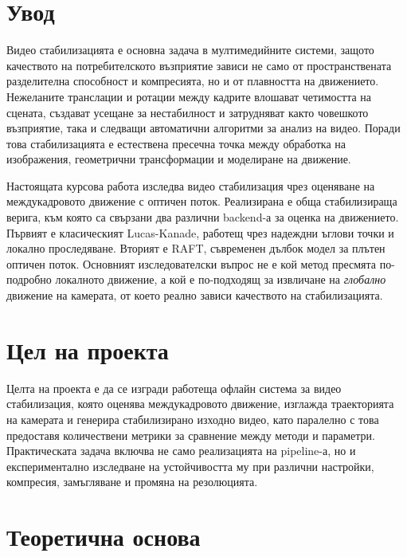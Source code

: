 \documentclass[12pt,a4paper]{article}
\begin{document}
\tableofcontents
\newpage

\section{Увод}
Видео стабилизацията е основна задача в мултимедийните системи, защото качеството на потребителското възприятие зависи не само от пространствената разделителна способност и компресията, но и от плавността на движението. Нежеланите транслации и ротации между кадрите влошават четимостта на сцената, създават усещане за нестабилност и затрудняват както човешкото възприятие, така и следващи автоматични алгоритми за анализ на видео. Поради това стабилизацията е естествена пресечна точка между обработка на изображения, геометрични трансформации и моделиране на движение.

Настоящата курсова работа изследва видео стабилизация чрез оценяване на междукадровото движение с оптичен поток. Реализирана е обща стабилизираща верига, към която са свързани два различни backend-а за оценка на движението. Първият е класическият Lucas-Kanade, работещ чрез надеждни ъглови точки и локално проследяване. Вторият е RAFT, съвременен дълбок модел за плътен оптичен поток. Основният изследователски въпрос не е кой метод пресмята по-подробно локалното движение, а кой е по-подходящ за извличане на \emph{глобално} движение на камерата, от което реално зависи качеството на стабилизацията.

\section{Цел на проекта}
Целта на проекта е да се изгради работеща офлайн система за видео стабилизация, която оценява междукадровото движение, изглажда траекторията на камерата и генерира стабилизирано изходно видео, като паралелно с това предоставя количествени метрики за сравнение между методи и параметри. Практическата задача включва не само реализацията на pipeline-а, но и експериментално изследване на устойчивостта му при различни настройки, компресия, замъгляване и промяна на резолюцията.

\section{Теоретична основа}
\end{document}
